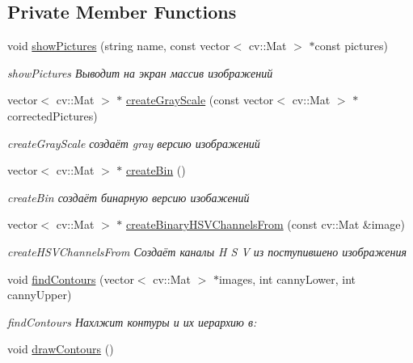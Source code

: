\subsection*{Private Member Functions}
\begin{DoxyCompactItemize}
\item 
void \hyperlink{class_search_outlines_abbd427cb74410f5919d779af6041f3b6}{show\+Pictures} (string name, const vector$<$ cv\+::\+Mat $>$ $\ast$const pictures)
\begin{DoxyCompactList}\small\item\em show\+Pictures Выводит на экран массив изображений  \end{DoxyCompactList}\item 
vector$<$ cv\+::\+Mat $>$ $\ast$ \hyperlink{class_search_outlines_ae2c5d2a7cf350f53dec9e1d966a5045a}{create\+Gray\+Scale} (const vector$<$ cv\+::\+Mat $>$ $\ast$corrected\+Pictures)
\begin{DoxyCompactList}\small\item\em create\+Gray\+Scale создаёт gray версию изображений \end{DoxyCompactList}\item 
vector$<$ cv\+::\+Mat $>$ $\ast$ \hyperlink{class_search_outlines_ac7706a914bd5abb1d2f21ecf13192461}{create\+Bin} ()
\begin{DoxyCompactList}\small\item\em create\+Bin создаёт бинарную версию изобажений \end{DoxyCompactList}\item 
vector$<$ cv\+::\+Mat $>$ $\ast$ \hyperlink{class_search_outlines_afb719de91ae7c9c8bcaf7e731223d9d5}{create\+Binary\+H\+S\+V\+Channels\+From} (const cv\+::\+Mat \&image)
\begin{DoxyCompactList}\small\item\em create\+H\+S\+V\+Channels\+From Создаёт каналы H S V из поступившено изображения \end{DoxyCompactList}\item 
void \hyperlink{class_search_outlines_a9885ced6ec7391c1a702f6b03bf4fe14}{find\+Contours} (vector$<$ cv\+::\+Mat $>$ $\ast$images, int canny\+Lower, int canny\+Upper)
\begin{DoxyCompactList}\small\item\em find\+Contours Нахлжит контуры и их иерархию в\+: \end{DoxyCompactList}\item 
void \hyperlink{class_search_outlines_aadf8088a83c200e865329c78e58b8674}{draw\+Contours} ()

\end{DoxyCompactItemize}
